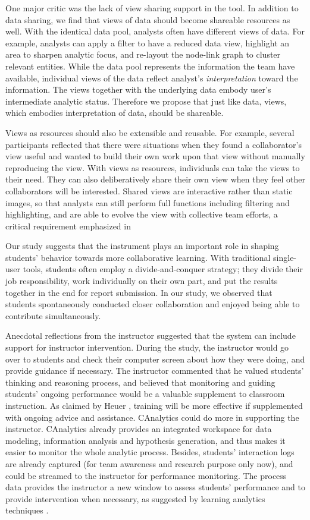 One major critic was the lack of view sharing support in the tool. In
addition to data sharing, we find that views of data should become
shareable resources as well. With the identical data pool, analysts
often have different views of data. For example, analysts can apply a
filter to have a reduced data view, highlight an area to sharpen
analytic focus, and re-layout the node-link graph to cluster relevant
entities. While the data pool represents the information the team have
available, individual views of the data reflect analyst's
\emph{interpretation} toward the information. The views together with
the underlying data embody user's intermediate analytic status.
Therefore we propose that just like data, views, which embodies
interpretation of data, should be shareable.

Views as resources should also be extensible and reusable. For example,
several participants reflected that there were situations when they
found a collaborator's view useful and wanted to build their own work
upon that view without manually reproducing the view. With views as
resources, individuals can take the views to their need. They can also
deliberatively share their own view when they feel other collaborators
will be interested. Shared views are interactive rather than static
images, so that analysts can still perform full functions including
filtering and highlighting, and are able to evolve the view with
collective team efforts, a critical requirement emphasized in
\autocite{Carroll2013}

Our study suggests that the instrument plays an important role in
shaping students' behavior towards more collaborative learning. With
traditional single-user tools, students often employ a
divide-and-conquer strategy; they divide their job responsibility, work
individually on their own part, and put the results together in the end
for report submission. In our study, we observed that students
spontaneously conducted closer collaboration and enjoyed being able to
contribute simultaneously.

Anecdotal reflections from the instructor suggested that the system can
include support for instructor intervention. During the study, the
instructor would go over to students and check their computer screen
about how they were doing, and provide guidance if necessary. The
instructor commented that he valued students' thinking and reasoning
process, and believed that monitoring and guiding students' ongoing
performance would be a valuable supplement to classroom instruction. As
claimed by Heuer \autocite{Heuer1999}, training will be more effective
if supplemented with ongoing advice and assistance. CAnalytics could do
more in supporting the instructor. CAnalytics already provides an
integrated workspace for data modeling, information analysis and
hypothesis generation, and thus makes it easier to monitor the whole
analytic process. Besides, students' interaction logs are already
captured (for team awareness and research purpose only now), and could
be streamed to the instructor for performance monitoring. The process
data provides the instructor a new window to assess students'
performance and to provide intervention when necessary, as suggested by
learning analytics techniques \autocite{Siemens2011}.